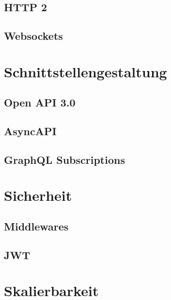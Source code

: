 \subsection{HTTP 2}
\label{subsec:http2}

\subsection{Websockets}
\label{subsec:websockets}


\section{Schnittstellengestaltung}
\label{sec:schnittstellengestaltung}

\subsection{Open API 3.0}
\label{subsec:openapi3}

\subsection{AsyncAPI}
\label{subsec:asyncapi}

\subsection{GraphQL Subscriptions}
\label{subsec:graphqlsubscriptions}

\section{Sicherheit}
\label{sec:sicherheit}

\subsection{Middlewares}
\label{subsec:middlewares}

\subsection{JWT}
\label{subsec:jwt}

\section{Skalierbarkeit}
\label{sec:skalierbarkeit}
